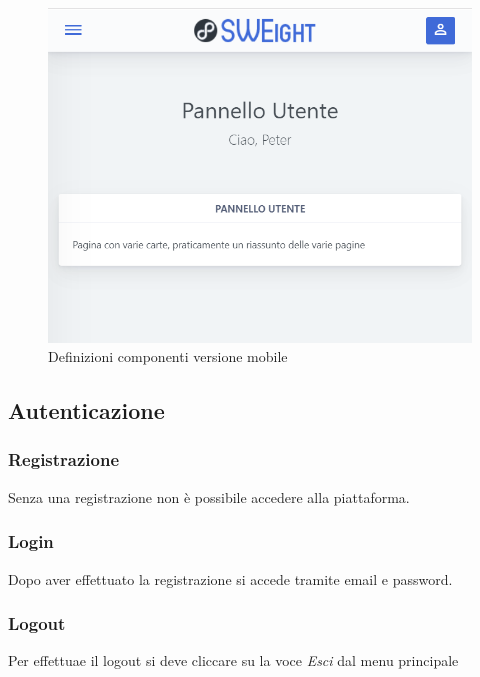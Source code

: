 \begin{figure}[H]
	\includegraphics[width=1\linewidth]{sez/img/istruzioni/dashboardPhone.PNG}
	\caption{Definizioni componenti versione mobile}
\end{figure}

\subsection{Autenticazione}
\subsubsection{Registrazione}
Senza una registrazione non è possibile accedere alla piattaforma.
\subsubsection{Login}
Dopo aver effettuato la registrazione si accede tramite email e password.
\subsubsection{Logout}
Per effettuae il {logout} si deve cliccare su la voce \textit{Esci} dal menu principale